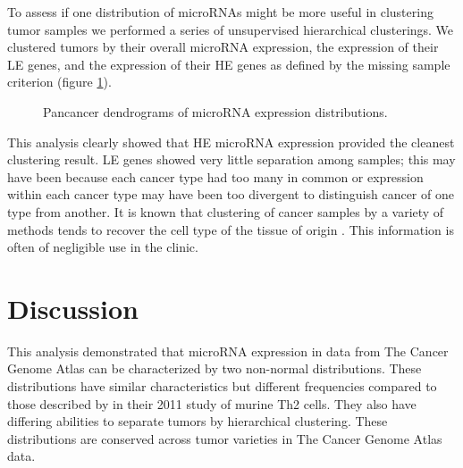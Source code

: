 \documentclass[12pt]{report}
\begin{document}
To assess if one distribution of microRNAs might be more useful in clustering tumor samples we performed a series of unsupervised hierarchical clusterings. We clustered
tumors by their overall microRNA expression, the expression of their LE genes, and the expression of their HE genes as defined by the missing sample criterion (figure \ref{fig::dendros}).

\begin{figure}[H]
  \centering
  \caption{Pancancer dendrograms of microRNA expression distributions.}
 \label{fig::dendros}
\end{figure}

This analysis clearly showed that HE microRNA expression provided the cleanest clustering result. LE genes showed very little separation among samples; this may have been because each
cancer type had too many in common or expression within each cancer type may have been too divergent to distinguish cancer of one type from another. It is known that clustering of cancer
samples by a variety of methods tends to recover the cell type of the tissue of origin \cite{Gaur2007}. This information is often of negligible use in the clinic.





\section*{Discussion}
  This analysis demonstrated that microRNA expression in data from The Cancer Genome Atlas can be characterized by two non-normal distributions. These distributions have similar characteristics but
  different frequencies compared to those described by \cite{Hebenstreit2011} in their 2011 study of murine Th2 cells. They also have differing abilities to separate tumors by hierarchical clustering.
  These distributions are conserved across tumor varieties in The Cancer Genome Atlas data.
  
\end{document}

